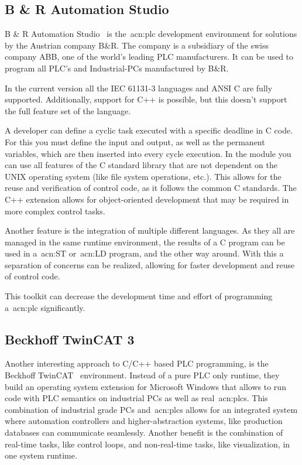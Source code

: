 \subsection{B \& R Automation Studio}
B \& R Automation Studio~\cite{b-r_automation:2020} is the~\acrshort{acn:plc} development environment for solutions by the Austrian company B\&R.
The company is a subsidiary of the swiss company ABB, one of the world's leading PLC manufacturers.
It can be used to program all PLC's and Industrial-PCs manufactured by B\&R.

In the current version all the IEC 61131-3 languages and ANSI C are fully supported.
Additionally, support for C++ is possible, but this doesn't support the full feature set of the language.

A developer can define a cyclic task executed with a specific deadline in C code.
For this you must define the input and output, as well as the permanent variables, which are then inserted into every cycle execution.
In the module you can use all features of the C standard library that are not dependent on the UNIX operating system (like file system operations, etc.).
This allows for the reuse and verification of control code, as it follows the common C standards.
The C++ extension allows for object-oriented development that may be required in more complex control tasks.

Another feature is the integration of multiple different languages.
As they all are managed in the same runtime environment, the results of a C program can be used in a~\acrfull{acn:ST} or~\acrfull{acn:LD} program, and the other way around.
With this a separation of concerns can be realized, allowing for faster development and reuse of control code.

This toolkit can decrease the development time and effort of programming a~\acrshort{acn:plc} significantly.

\subsection{Beckhoff TwinCAT 3}

Another interesting approach to C/C++ based PLC programming, is the Beckhoff TwinCAT~\cite{Beckhoff:2020:2} environment.
Instead of a pure PLC only runtime, they build an operating system extension for Microsoft Windows that allows to run code with PLC semantics on industrial PCs as well as real~\acrshort{acn:plc}s.
This combination of industrial grade PCs and~\acrshort{acn:plc}s allows for an integrated system where automation controllers and higher-abstraction systems, like production databases can communicate seamlessly.
Another benefit is the combination of real-time tasks, like control loops, and non-real-time tasks, like visualization, in one system runtime.

